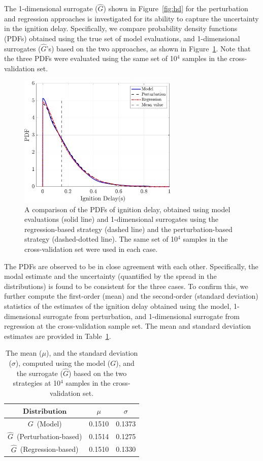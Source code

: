 The 1-dimensional surrogate ($\hat{G}$) shown in Figure~\ref{fig:hd} for the perturbation
and regression approaches is investigated for its ability to capture the uncertainty in the
ignition delay. Specifically, we compare probability density functions (PDFs)
obtained using the true set of model evaluations, and 1-dimensional
surrogates ($\hat{G}$'s) based on the two approaches, as shown in 
Figure~\ref{fig:pdf_36D}. Note that the three PDFs were evaluated using the same set of 10$^4$ samples in the 
cross-validation set. 
%
\begin{figure}[htbp]
\begin{center}
\includegraphics[width=3.0in]{pdf_plot36Dp2}
\end{center} 
\caption{A comparison of the PDFs of ignition delay, obtained using model 
evaluations (solid line) and 1-dimensional surrogates using the regression-based strategy (dashed line) and the
perturbation-based strategy (dashed-dotted line). The same set of 10$^4$ samples in the cross-validation set were 
used in each case.}
\label{fig:pdf_36D}
\end{figure}
%
The PDFs are observed to be in close agreement with each other. Specifically, the modal
estimate and the uncertainty (quantified by the spread in the distributions) is found to be consistent for the three 
cases. To confirm this, we further compute the first-order (mean) and the second-order (standard deviation) 
statistics
of the estimates of the ignition delay obtained using the model, 1-dimensional surrogate from perturbation, and
1-dimensional surrogate from regression at the cross-validation sample set. The mean and standard deviation
estimates are provided in Table~\ref{tab:stats}.
%
\begin{table}[htbp]
\begin{center}
\begin{tabular}{ccc}
\toprule
$\textbf{Distribution}$ & $\mu$ & $\sigma$ \\ 
\bottomrule
$G$~(Model) & 0.1510 & 0.1373 \\
$\hat{G}$~(Perturbation-based) & 0.1514 & 0.1275 \\
$\hat{G}$~(Regression-based) & 0.1510 & 0.1330 \\
\bottomrule
\end{tabular}
\caption{The mean ($\mu$), and the standard deviation ($\sigma$), computed using the model ($G$), and
the surrogate ($\hat{G}$) based on the two strategies at 10$^4$ samples in the cross-validation
set.}
\label{tab:stats}
\end{center}
\end{table}
